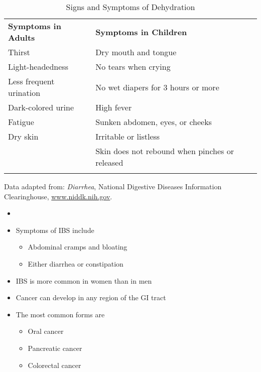 \documentclass[title={Chapter 3}]{fdsn201notes}
\begin{document}
\begin{table}[H]
	\centering
	\begin{threeparttable}
		\caption{Signs and Symptoms of Dehydration}
		\label{tab:signs-and-symptoms-of-dehydration}
		\begin{tabular}{p{} p{}}
			\rowcolor{rowdarkgreen}\textbf{Symptoms in Adults} & \textbf{Symptoms in Children}\\
			Thirst & Dry mouth and tongue\\
			Light-headedness & No tears when crying\\
			Less frequent urination & No wet diapers for 3 hours or more\\
			Dark-colored urine & High fever\\
			Fatigue & Sunken abdomen, eyes, or cheeks\\
			Dry skin & Irritable or listless\\
			& Skin does not rebound when pinches or released\\
			\rowcolor{rowdarkgreen} &
		\end{tabular}
		\begin{tablenotes}
			\small
			\item Data adapted from: \emph{Diarrhea}, National Digestive Diseases Information Clearinghouse, \url{www.niddk.nih.gov}.
		\end{tablenotes}
	\end{threeparttable}
\end{table}

\begin{itemize}
	\item {}
	\item Symptoms of IBS include
	\begin{itemize}
		\item Abdominal cramps and bloating
		\item Either diarrhea or constipation
	\end{itemize}
	\item IBS is more common in women than in men
	\item Cancer can develop in any region of the GI tract
	\item The most common forms are
	\begin{itemize}
		\item Oral cancer
		\item Pancreatic cancer
		\item Colorectal cancer
	\end{itemize}
\end{itemize}
\end{document}
